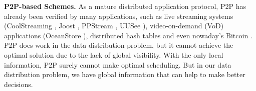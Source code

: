 \textbf{P2P-based Schemes.} As a mature distributed application protocol, P2P has already been verified by many applications, such as live streaming systems (CoolStreaming \cite{zhang2005coolstreaming}, Joost \cite{Joost}, PPStream \cite{PPStream}, UUSee \cite{UUSee}), video-on-demand (VoD) applications (OceanStore \cite{oceanstore}), distributed hash tables \cite{rhea2005opendht} and even nowaday's Bitcoin \cite{eyal2016bitcoin}. P2P does work in the data distribution problem, but it cannot achieve the optimal solution due to the lack of global visibility. With the only local information, P2P surely cannot make optimal scheduling. But in our data distribution problem, we have global information that can help to make better decisions.
